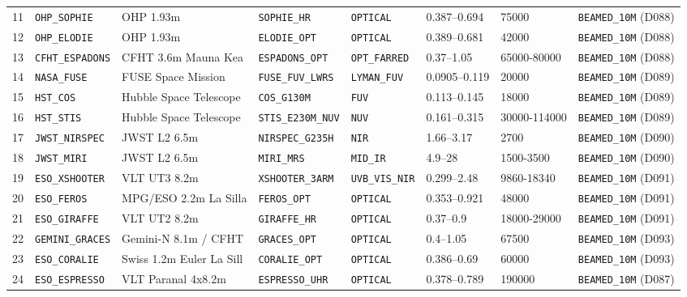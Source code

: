 \documentclass[twocolumn,10pt]{article}
\begin{document}
\begin{table}[!ht]
{\begin{tabular}{rlllllll}
11 & \texttt{OHP\_SOPHIE} & OHP 1.93m & \texttt{SOPHIE\_HR} & \texttt{OPTICAL} & 0.387--0.694 & 75000 & \texttt{BEAMED\_10M} (D088) \\
12 & \texttt{OHP\_ELODIE} & OHP 1.93m & \texttt{ELODIE\_OPT} & \texttt{OPTICAL} & 0.389--0.681 & 42000 & \texttt{BEAMED\_10M} (D088) \\
13 & \texttt{CFHT\_ESPADONS} & CFHT 3.6m Mauna Kea & \texttt{ESPADONS\_OPT} & \texttt{OPT\_FARRED} & 0.37--1.05 & 65000-80000 & \texttt{BEAMED\_10M} (D088) \\
14 & \texttt{NASA\_FUSE} & FUSE Space Mission & \texttt{FUSE\_FUV\_LWRS} & \texttt{LYMAN\_FUV} & 0.0905--0.119 & 20000 & \texttt{BEAMED\_10M} (D089) \\
15 & \texttt{HST\_COS} & Hubble Space Telescope & \texttt{COS\_G130M} & \texttt{FUV} & 0.113--0.145 & 18000 & \texttt{BEAMED\_10M} (D089) \\
16 & \texttt{HST\_STIS} & Hubble Space Telescope & \texttt{STIS\_E230M\_NUV} & \texttt{NUV} & 0.161--0.315 & 30000-114000 & \texttt{BEAMED\_10M} (D089) \\
17 & \texttt{JWST\_NIRSPEC} & JWST L2 6.5m & \texttt{NIRSPEC\_G235H} & \texttt{NIR} & 1.66--3.17 & 2700 & \texttt{BEAMED\_10M} (D090) \\
18 & \texttt{JWST\_MIRI} & JWST L2 6.5m & \texttt{MIRI\_MRS} & \texttt{MID\_IR} & 4.9--28 & 1500-3500 & \texttt{BEAMED\_10M} (D090) \\
19 & \texttt{ESO\_XSHOOTER} & VLT UT3 8.2m & \texttt{XSHOOTER\_3ARM} & \texttt{UVB\_VIS\_NIR} & 0.299--2.48 & 9860-18340 & \texttt{BEAMED\_10M} (D091) \\
20 & \texttt{ESO\_FEROS} & MPG/ESO 2.2m La Silla & \texttt{FEROS\_OPT} & \texttt{OPTICAL} & 0.353--0.921 & 48000 & \texttt{BEAMED\_10M} (D091) \\
21 & \texttt{ESO\_GIRAFFE} & VLT UT2 8.2m & \texttt{GIRAFFE\_HR} & \texttt{OPTICAL} & 0.37--0.9 & 18000-29000 & \texttt{BEAMED\_10M} (D091) \\
22 & \texttt{GEMINI\_GRACES} & Gemini-N 8.1m / CFHT & \texttt{GRACES\_OPT} & \texttt{OPTICAL} & 0.4--1.05 & 67500 & \texttt{BEAMED\_10M} (D093) \\
23 & \texttt{ESO\_CORALIE} & Swiss 1.2m Euler La Sill & \texttt{CORALIE\_OPT} & \texttt{OPTICAL} & 0.386--0.69 & 60000 & \texttt{BEAMED\_10M} (D093) \\
24 & \texttt{ESO\_ESPRESSO} & VLT Paranal 4x8.2m & \texttt{ESPRESSO\_UHR} & \texttt{OPTICAL} & 0.378--0.789 & 190000 & \texttt{BEAMED\_10M} (D087) \\

\end{tabular}}
\end{table}
\end{document}
